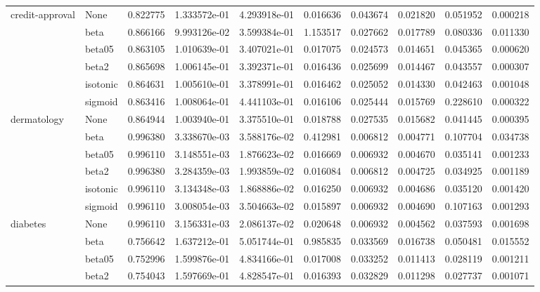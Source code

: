 \begin{tabular}{llrrrrrrrr}
credit-approval & None &  0.822775 &  1.333572e-01 &  4.293918e-01 &   0.016636 &  0.043674 &  0.021820 &  0.051952 &  0.000218 \\
        & beta &  0.866166 &  9.993126e-02 &  3.599384e-01 &   1.153517 &  0.027662 &  0.017789 &  0.080336 &  0.011330 \\
        & beta05 &  0.863105 &  1.010639e-01 &  3.407021e-01 &   0.017075 &  0.024573 &  0.014651 &  0.045365 &  0.000620 \\
        & beta2 &  0.865698 &  1.006145e-01 &  3.392371e-01 &   0.016436 &  0.025699 &  0.014467 &  0.043557 &  0.000307 \\
        & isotonic &  0.864631 &  1.005610e-01 &  3.378991e-01 &   0.016462 &  0.025052 &  0.014330 &  0.042463 &  0.001048 \\
        & sigmoid &  0.863416 &  1.008064e-01 &  4.441103e-01 &   0.016106 &  0.025444 &  0.015769 &  0.228610 &  0.000322 \\
dermatology & None &  0.864944 &  1.003940e-01 &  3.375510e-01 &   0.018788 &  0.027535 &  0.015682 &  0.041445 &  0.000395 \\
        & beta &  0.996380 &  3.338670e-03 &  3.588176e-02 &   0.412981 &  0.006812 &  0.004771 &  0.107704 &  0.034738 \\
        & beta05 &  0.996110 &  3.148551e-03 &  1.876623e-02 &   0.016669 &  0.006932 &  0.004670 &  0.035141 &  0.001233 \\
        & beta2 &  0.996380 &  3.284359e-03 &  1.993859e-02 &   0.016084 &  0.006812 &  0.004725 &  0.034925 &  0.001189 \\
        & isotonic &  0.996110 &  3.134348e-03 &  1.868886e-02 &   0.016250 &  0.006932 &  0.004686 &  0.035120 &  0.001420 \\
        & sigmoid &  0.996110 &  3.008054e-03 &  3.504663e-02 &   0.015897 &  0.006932 &  0.004690 &  0.107163 &  0.001293 \\
diabetes & None &  0.996110 &  3.156331e-03 &  2.086137e-02 &   0.020648 &  0.006932 &  0.004562 &  0.037593 &  0.001698 \\
        & beta &  0.756642 &  1.637212e-01 &  5.051744e-01 &   0.985835 &  0.033569 &  0.016738 &  0.050481 &  0.015552 \\
        & beta05 &  0.752996 &  1.599876e-01 &  4.834166e-01 &   0.017008 &  0.033252 &  0.011413 &  0.028119 &  0.001211 \\
        & beta2 &  0.754043 &  1.597669e-01 &  4.828547e-01 &   0.016393 &  0.032829 &  0.011298 &  0.027737 &  0.001071 \\

\end{tabular}
